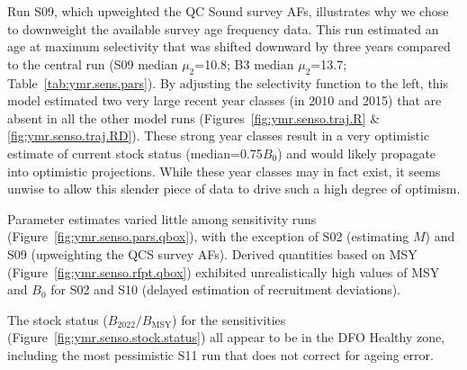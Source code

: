 \documentclass[11pt]{book}
\newcommand{\Bmsy}{B_\mathrm{MSY}}
\begin{document}
Run S09, which upweighted the QC Sound survey AFs, illustrates why we chose to downweight the available survey age frequency data.
This run estimated an age at maximum selectivity that was shifted downward by three years compared to the central run (S09 median $\mu_2$=10.8; B3 median $\mu_2$=13.7; Table~\ref{tab:ymr.sens.pars}).
By adjusting the selectivity function to the left, this model estimated two very large recent year classes (in 2010 and 2015) that are absent in all the other model runs (Figures~\ref{fig:ymr.senso.traj.R} \& \ref{fig:ymr.senso.traj.RD}).
These strong year classes result in a very optimistic estimate of current stock status (median=0.75$B_0$) and would likely propagate into optimistic projections.
While these year classes may in fact exist, it seems unwise to allow this slender piece of data to drive such a high degree of optimism.

Parameter estimates varied little among sensitivity runs (Figure~\ref{fig:ymr.senso.pars.qbox}), with the exception of S02 (estimating $M$) and S09 (upweighting the QCS survey AFs).
Derived quantities based on MSY (Figure~\ref{fig:ymr.senso.rfpt.qbox}) exhibited unrealistically high values of MSY and $B_0$ for S02 and S10 (delayed estimation of recruitment deviations).

The stock status ($B_{2022}/\Bmsy$) for the sensitivities (Figure~\ref{fig:ymr.senso.stock.status}) all appear to be in the DFO Healthy zone, including the most pessimistic S11 run that does not correct for ageing error.

\begin{landscapepage}{}{\LH}{\RH}{\LF}{\RF}
\end{landscapepage}

\begin{landscapepage}{

}{\LH}{\RH}{\LF}{\RF} \end{landscapepage}

\begin{landscapepage}{
	
}{\LH}{\RH}{\LF}{\RF} \end{landscapepage}

\setlength{\tabcolsep}{3pt}
\clearpage


\end{document}
